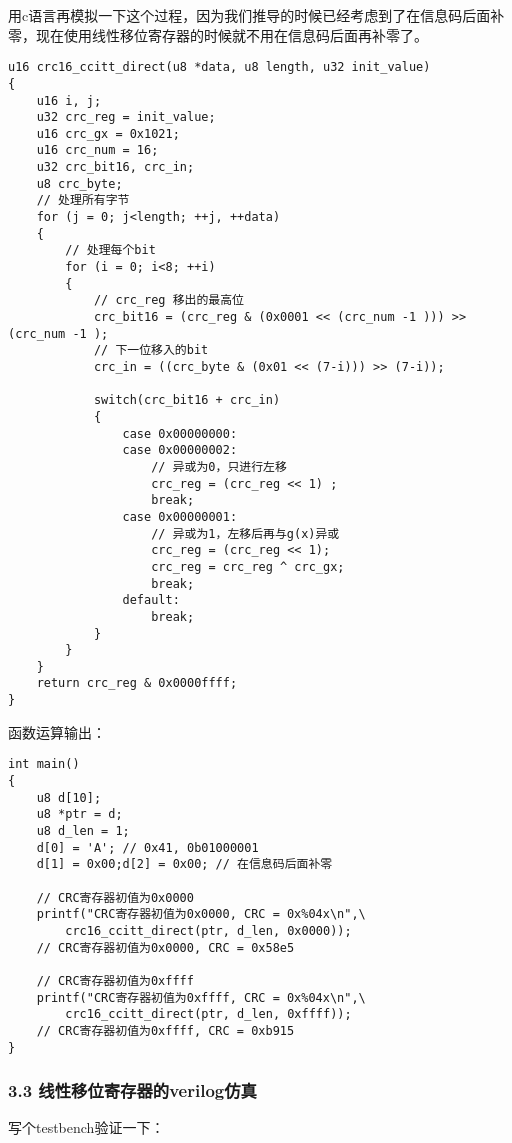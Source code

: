 \documentclass[
]{article}
\begin{document}
用c语言再模拟一下这个过程，因为我们推导的时候已经考虑到了在信息码后面补零，现在使用线性移位寄存器的时候就不用在信息码后面再补零了。

\begin{lstlisting}[style={c-style}]
u16 crc16_ccitt_direct(u8 *data, u8 length, u32 init_value)
{
    u16 i, j;
    u32 crc_reg = init_value;
    u16 crc_gx = 0x1021;
    u16 crc_num = 16;
    u32 crc_bit16, crc_in;
    u8 crc_byte;
    // 处理所有字节
    for (j = 0; j<length; ++j, ++data)
    {
        // 处理每个bit
        for (i = 0; i<8; ++i)
        {
            // crc_reg 移出的最高位
            crc_bit16 = (crc_reg & (0x0001 << (crc_num -1 ))) >> (crc_num -1 );
            // 下一位移入的bit
            crc_in = ((crc_byte & (0x01 << (7-i))) >> (7-i));

            switch(crc_bit16 + crc_in)
            {
                case 0x00000000:
                case 0x00000002:
                    // 异或为0，只进行左移
                    crc_reg = (crc_reg << 1) ;
                    break;
                case 0x00000001:
                    // 异或为1，左移后再与g(x)异或
                    crc_reg = (crc_reg << 1);
                    crc_reg = crc_reg ^ crc_gx;
                    break;
                default:
                    break;
            }
        }
    }
    return crc_reg & 0x0000ffff;
}
\end{lstlisting}

函数运算输出：

\begin{lstlisting}[style={c-style}]
int main()
{
    u8 d[10];
    u8 *ptr = d;
    u8 d_len = 1;
    d[0] = 'A'; // 0x41, 0b01000001
    d[1] = 0x00;d[2] = 0x00; // 在信息码后面补零
    
    // CRC寄存器初值为0x0000
    printf("CRC寄存器初值为0x0000, CRC = 0x%04x\n",\
        crc16_ccitt_direct(ptr, d_len, 0x0000));
    // CRC寄存器初值为0x0000, CRC = 0x58e5 
    
    // CRC寄存器初值为0xffff
    printf("CRC寄存器初值为0xffff, CRC = 0x%04x\n",\
        crc16_ccitt_direct(ptr, d_len, 0xffff));
    // CRC寄存器初值为0xffff, CRC = 0xb915
}
\end{lstlisting}

\hypertarget{header-n168}{%
\subsubsection{3.3 线性移位寄存器的verilog仿真}\label{header-n168}}

写个testbench验证一下：
\end{document}
